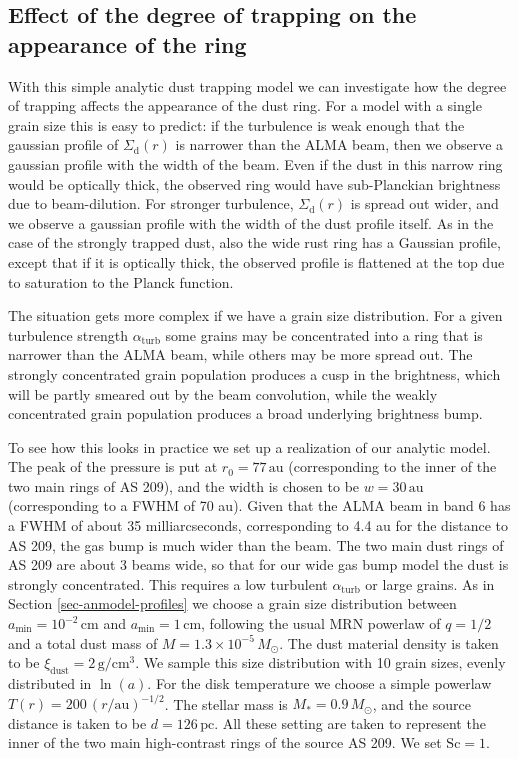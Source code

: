 \documentclass{aa}
\begin{document}
\subsection{Effect of the degree of trapping on the appearance of the ring}
\label{sec-anmodel-degree-trapping-alpha-series}
%
With this simple analytic dust trapping model we can investigate how the degree
of trapping affects the appearance of the dust ring. For a model with a single
grain size this is easy to predict: if the turbulence is weak enough that the
gaussian profile of $\Sigma_{\mathrm{d}}(r)$ is narrower than the ALMA beam,
then we observe a gaussian profile with the width of the beam. Even if the dust
in this narrow ring would be optically thick, the observed ring would have
sub-Planckian brightness due to beam-dilution. For stronger turbulence,
$\Sigma_{\mathrm{d}}(r)$ is spread out wider, and we observe a gaussian profile
with the width of the dust profile itself. As in the case of the strongly
trapped dust, also the wide rust ring has a Gaussian profile, except that if it
is optically thick, the observed profile is flattened at the top due to
saturation to the Planck function.

The situation gets more complex if we have a grain size distribution. For a
given turbulence strength $\alpha_{\mathrm{turb}}$ some grains may be
concentrated into a ring that is narrower than the ALMA beam, while others may
be more spread out. The strongly concentrated grain population produces a cusp
in the brightness, which will be partly smeared out by the beam convolution,
while the weakly concentrated grain population produces a broad underlying
brightness bump.

To see how this looks in practice we set up a realization of our analytic
model. The peak of the pressure is put at $r_{0}=77\,\mathrm{au}$ (corresponding
to the inner of the two main rings of AS 209), and the width is chosen to be
$w=30\,\mathrm{au}$ (corresponding to a FWHM of 70 au).  Given that the ALMA
beam in band 6 has a FWHM of about 35 milliarcseconds, corresponding to 4.4 au
for the distance to AS 209, the gas bump is much wider than the beam. The two
main dust rings of AS 209 are about 3 beams wide, so that for our wide gas bump
model the dust is strongly concentrated. This requires a low turbulent
$\alpha_{\mathrm{turb}}$ or large grains. As in Section
\ref{sec-anmodel-profiles} we choose a grain size distribution between
$a_{\mathrm{min}}=10^{-2}\,\mathrm{cm}$ and $a_{\mathrm{min}}=1\,\mathrm{cm}$,
following the usual MRN powerlaw of $q=1/2$ and a total dust mass of
$M=1.3\times 10^{-5}\,M_\odot$. The dust material density is taken to be
$\xi_{\mathrm{dust}}=2\,\mathrm{g}/\mathrm{cm}^3$. We sample this size
distribution with 10 grain sizes, evenly distributed in $\ln(a)$. For the disk
temperature we choose a simple powerlaw $T(r)=200\,(r/\mathrm{au})^{-1/2}$. The
stellar mass is $M_{*}=0.9\,M_\odot$, and the source distance is taken to be
$d=126\,\mathrm{pc}$. All these setting are taken to represent the inner of the
two main high-contrast rings of the source AS 209. We set $\mathrm{Sc}=1$.
\end{document}
